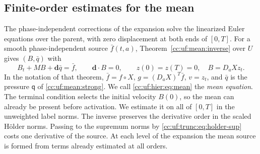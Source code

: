 \subsection{Finite-order estimates for the mean}\label{cc:uf:mean:sec:finite}
The phase-independent corrections of the expansion solve the linearized
Euler equations over the parent, with zero displacement at both ends of
$[0,T]$. For a smooth phase-independent source \(\bar f(t,a)\),
Theorem~\ref{cc:uf:mean:inverse} over $U$
gives \((B,\bar q)\) with
\begin{equation}\label{cc:uf:hier:eq:mean}
 B_t+MB+\mathbf d\bar q=\bar f,\qquad \mathbf d\cdot B=0,\qquad
 z(0)=z(T)=0,\quad B=D_aX z_t.
\end{equation}
In the notation of that theorem, $\bar f=f\circ X$,
$g=(D_aX)^T\bar f$, $v=z_t$, and $\bar q$ is the pressure $\mathsf q$ of
\eqref{cc:uf:mean:strong}. We call \eqref{cc:uf:hier:eq:mean} the
\emph{mean equation}. The terminal condition selects the initial
velocity $B(0)$, so the mean can already be present before activation.
We estimate it on all of $[0,T]$ in the unweighted label norms.
The inverse preserves the derivative order in the scaled H\"older
norms. Passing to the supremum norms by \eqref{cc:uf:trunc:eq:holder-sup}
costs one derivative of the source. At each level of the expansion
the mean source is formed from terms already estimated at all orders.

